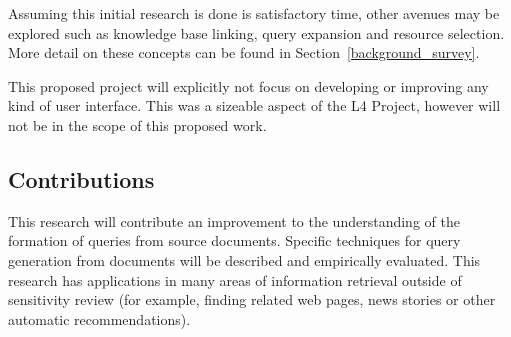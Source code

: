 \documentclass{mprop}
\begin{document}
Assuming this initial research is done is satisfactory time, other avenues may be explored such as knowledge base linking, query expansion and resource selection. More detail on these concepts can be found in Section~\ref{background_survey}.

This proposed project will explicitly not focus on developing or improving any kind of user interface. This was a sizeable aspect of the L4 Project, however will not be in the scope of this proposed work.



\subsection{Contributions}
This research will contribute an improvement to the understanding of the formation of queries from source documents. Specific techniques for query generation from documents will be described and empirically evaluated. This research has applications in many areas of information retrieval outside of sensitivity review (for example, finding related web pages, news stories or other automatic recommendations).
\end{document}
